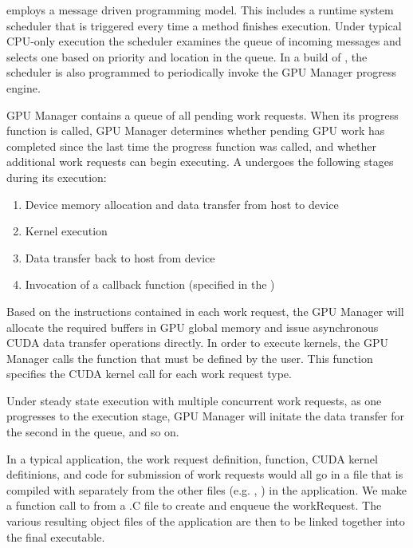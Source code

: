\documentclass[10pt]{report}
\begin{document}
\charmpp{} employs a message driven programming model. This includes a runtime
system scheduler that is triggered every time a method finishes execution. Under
typical CPU-only execution the scheduler examines the queue of incoming messages
and selects one based on priority and location in the queue. In a \cuda{}
build of \charmpp{}, the scheduler is also programmed to periodically invoke the
GPU Manager progress engine.

GPU Manager contains a queue of all pending work requests. When its progress
function is called, GPU Manager determines whether pending GPU work has
completed since the last time the progress function was called, and whether
additional work requests can begin executing. A  undergoes the
following stages during its execution:

\begin{enumerate}
\item Device memory allocation and data transfer from host to device
\item Kernel execution
\item Data transfer back to host from device
\item Invocation of a callback function (specified in the )
\end{enumerate}

Based on the instructions contained in each work request, the GPU Manager will
allocate the required buffers in GPU global memory and issue asynchronous CUDA
data transfer operations directly. In order to execute kernels, the GPU Manager
calls the  function that must be defined by the user. This
function specifies the CUDA kernel call for each work request type.

Under steady state execution with multiple concurrent work requests, as
one  progresses to the execution stage, GPU Manager will
initate the data transfer for the second
 in the queue, and so on.

In a typical application, the work request definition,
 function, CUDA kernel defitinions, and code for submission
of work requests would all go in a  file that is compiled with
 separately from the other files (e.g. , ) in the
\charmpp{} application.
We make a function call to  from a .C file to create
and enqueue the workRequest.
The various resulting object files of the application are then to be linked
together into the final executable.
\end{document}
